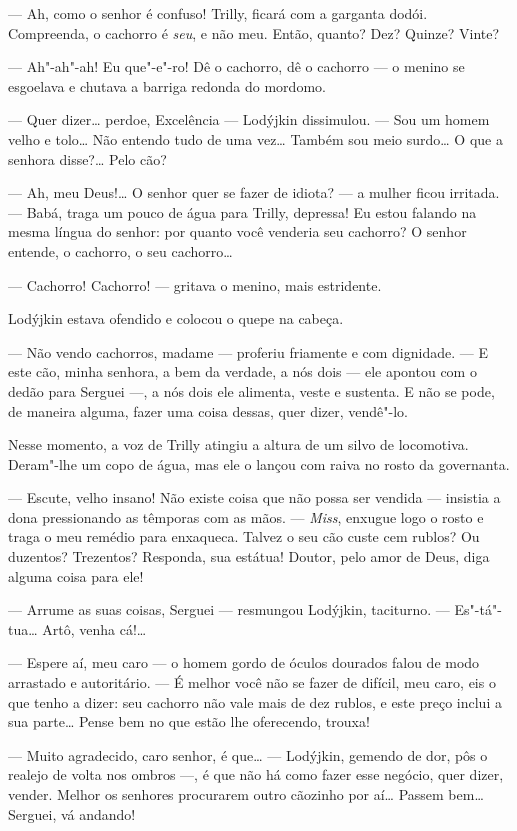 --- Ah, como o senhor é confuso! Trilly, ficará com a garganta dodói.
Compreenda, o cachorro é \emph{seu}, e não meu. Então, quanto? Dez?
Quinze? Vinte?

--- Ah"-ah"-ah! Eu que"-e"-ro! Dê o cachorro, dê o cachorro --- o menino se
esgoelava e chutava a barriga redonda do mordomo.

--- Quer dizer\ldots{} perdoe, Excelência --- Lodýjkin dissimulou. --- Sou um
homem velho e tolo\ldots{} Não entendo tudo de uma vez\ldots{} Também sou meio
surdo\ldots{} O que a senhora disse?\ldots{} Pelo cão?

--- Ah, meu Deus!\ldots{} O senhor quer se fazer de idiota? --- a mulher
ficou irritada. --- Babá, traga um pouco de água para Trilly, depressa!
Eu estou falando na mesma língua do senhor: por quanto você venderia seu
cachorro? O senhor entende, o cachorro, o seu cachorro\ldots{}

--- Cachorro! Cachorro! --- gritava o menino, mais estridente.

Lodýjkin estava ofendido e colocou o quepe na cabeça.

--- Não vendo cachorros, madame --- proferiu friamente e com dignidade.
--- E este cão, minha senhora, a bem da verdade, a nós dois --- ele
apontou com o dedão para Serguei ---, a nós dois ele alimenta, veste e
sustenta. E não se pode, de maneira alguma, fazer uma coisa dessas, quer
dizer, vendê"-lo.

Nesse momento, a voz de Trilly atingiu a altura de um silvo de
locomotiva. Deram"-lhe um copo de água, mas ele o lançou com raiva no
rosto da governanta.

--- Escute, velho insano! Não existe coisa que não possa ser vendida ---
insistia a dona pressionando as têmporas com as mãos. --- \emph{Miss},
enxugue logo o rosto e traga o meu remédio para enxaqueca. Talvez o seu
cão custe cem rublos? Ou duzentos? Trezentos? Responda, sua estátua!
Doutor, pelo amor de Deus, diga alguma coisa para ele!

--- Arrume as suas coisas, Serguei --- resmungou Lodýjkin, taciturno.
--- Es"-tá"-tua\ldots{} Artô, venha cá!\ldots{}

--- Espere aí, meu caro --- o homem gordo de óculos dourados falou de
modo arrastado e autoritário. --- É melhor você não se fazer de difícil,
meu caro, eis o que tenho a dizer: seu cachorro não vale mais de dez
rublos, e este preço inclui a sua parte\ldots{} Pense bem no que estão lhe
oferecendo, trouxa!

--- Muito agradecido, caro senhor, é que\ldots{} --- Lodýjkin, gemendo de
dor, pôs o realejo de volta nos ombros ---, é que não há como fazer esse
negócio, quer dizer, vender. Melhor os senhores procurarem outro
cãozinho por aí\ldots{} Passem bem\ldots{} Serguei, vá andando!

